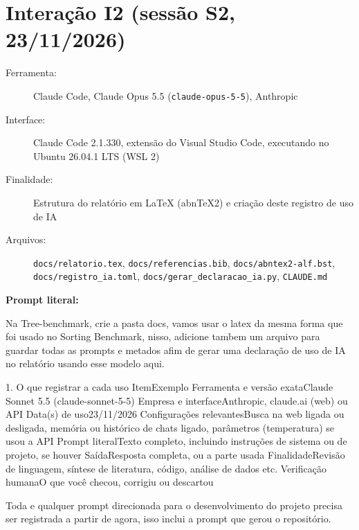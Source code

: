 \section*{Interação I2 (sessão S2, 23/11/2026)}
{\raggedright
\begin{description}
    \item[Ferramenta:] Claude Code, Claude Opus 5.5 (\texttt{claude-opus-5-5}), Anthropic
    \item[Interface:] Claude Code 2.1.330, extensão do Visual Studio Code, executando no Ubuntu 26.04.1 LTS (WSL 2)
    \item[Finalidade:] Estrutura do relatório em LaTeX (abnTeX2) e criação deste registro de uso de IA
    \item[Arquivos:] \texttt{docs/relatorio.tex}, \texttt{docs/referencias.bib}, \texttt{docs/abntex2-alf.bst}, \texttt{docs/registro\_ia.toml}, \texttt{docs/gerar\_declaracao\_ia.py}, \texttt{CLAUDE.md}
\end{description}
}
\textbf{Prompt literal:}
\begin{registroia}
Na Tree-benchmark, crie a pasta docs, vamos usar o latex da mesma forma que foi usado no Sorting Benchmark, nisso, adicione tambem um arquivo para guardar todas as prompts e metados afim de gerar uma declaração de uso de IA no relatório usando esse modelo aqui.

1. O que registrar a cada uso \newline
Item\quad{}Exemplo \newline
Ferramenta e versão exata\quad{}Claude Sonnet 5.5 (claude-sonnet-5-5) \newline
Empresa e interface\quad{}Anthropic, claude.ai (web) ou API \newline
Data(s) de uso\quad{}23/11/2026 \newline
Configurações relevantes\quad{}Busca na web ligada ou desligada, memória ou histórico de chats ligado, parâmetros (temperatura) se usou a API \newline
Prompt literal\quad{}Texto completo, incluindo instruções de sistema ou de projeto, se houver \newline
Saída\quad{}Resposta completa, ou a parte usada \newline
Finalidade\quad{}Revisão de linguagem, síntese de literatura, código, análise de dados etc. \newline
Verificação humana\quad{}O que você checou, corrigiu ou descartou

Toda e qualquer prompt direcionada para o desenvolvimento do projeto precisa ser registrada a partir de agora, isso inclui a prompt que gerou o repositório.
\end{registroia}

